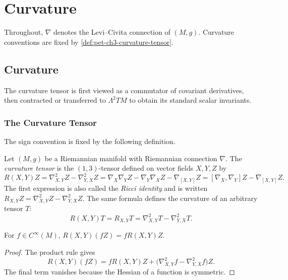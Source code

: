 \chapter{Curvature}
\label{chap:pet-curvature}

Throughout, $\nabla$ denotes the Levi--Civita connection of $(M,g)$. Curvature
conventions are fixed by \cref{def:pet-ch3-curvature-tensor}.

\section{Curvature}

The curvature tensor is first viewed as a commutator of covariant derivatives,
then contracted or transferred to $\Lambda^2TM$ to obtain its standard scalar
invariants.

\subsection{The Curvature Tensor}

The sign convention is fixed by the following definition.

\begin{definition}
  \label{def:pet-ch3-curvature-tensor}


  Let $(M,g)$ be a Riemannian manifold with Riemannian connection $\nabla$. The
  \emph{curvature tensor} is the $(1,3)$-tensor defined on vector fields $X,Y,Z$ by
  \[
    R(X,Y)Z=\nabla^2_{X,Y}Z-\nabla^2_{Y,X}Z
    =\nabla_X\nabla_YZ-\nabla_Y\nabla_XZ-\nabla_{[X,Y]}Z
    =[\nabla_X,\nabla_Y]Z-\nabla_{[X,Y]}Z.
  \]
  The first expression is also called the \emph{Ricci identity} and is written
  $R_{X,Y}Z=\nabla^2_{X,Y}Z-\nabla^2_{Y,X}Z$. The same formula defines the
  curvature of an arbitrary tensor $T$:
  \[
    R(X,Y)T=R_{X,Y}T=\nabla^2_{X,Y}T-\nabla^2_{Y,X}T.
  \]
\end{definition}

\begin{lemma}
  \label{lem:pet-ch3-curvature-tensor-tensorial}


  For $f\in C^\infty(M)$,
  $R(X,Y)(fZ)=fR(X,Y)Z$.
\end{lemma}
\begin{proof}

  \sketch
  The product rule gives
  \[
   R(X,Y)(fZ)=fR(X,Y)Z+
   \bigl(\nabla^2_{X,Y}f-\nabla^2_{Y,X}f\bigr)Z.
  \]
  The final term vanishes because the Hessian of a function is symmetric.
\end{proof}

